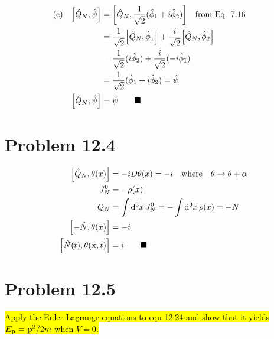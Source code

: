 \documentclass{article}
\begin{document}
\begin{align*}
    \qq*{(c)}\bqty{\hat{Q}_N,\hat{\psi}} & =\bqty{\hat{Q}_N,\frac{1}{\sqrt{2}}(\hat{\phi}_1+i\hat{\phi}_2)}\qq{from Eq. 7.16}                   \\
                                         & =\frac{1}{\sqrt{2}}\bqty{\hat{Q}_N,\hat{\phi}_1}+    \frac{i}{\sqrt{2}}\bqty{\hat{Q}_N,\hat{\phi}_2} \\
                                         & =\frac{1}{\sqrt{2}}(i\hat{\phi}_2)+\frac{i}{\sqrt{2}}(-i\hat{\phi}_1)                                \\
                                         & =\frac{1}{\sqrt{2}}(\hat{\phi}_1+i\hat{\phi}_2)=\hat{\psi}                                           \\
    \bqty{\hat{Q}_N,\hat{\psi}}          & =\hat{\psi}\qquad\blacksquare                                                                        \\
\end{align*}


\section*{Problem 12.4}

\begin{align*}
    \bqty{\hat{Q}_N,\theta(x)}         & =-iD\theta(x)=-i\qq{where}\theta \rightarrow\theta+\alpha \\
    J^0_N                              & =-\rho(x)                                                 \\
    Q_N                                & =\int\dd[3]{x}J^0_N=-\int\dd[3]{x}\rho(x)=-N              \\
    \bqty{-\hat{N},\theta(x)}          & =-i                                                       \\
    \bqty{\hat{N}(t),\theta(\vb{x},t)} & =i\qquad\blacksquare                                      \\
\end{align*}

\section*{Problem 12.5}
\begin{quoting}
    \hl{Apply the Euler-Lagrange equations to eqn 12.24 and show that it yields $E_{\vb{p}}=\vb{p}^2 /2m$ when $V=0$.}
\end{quoting}
\end{document}

